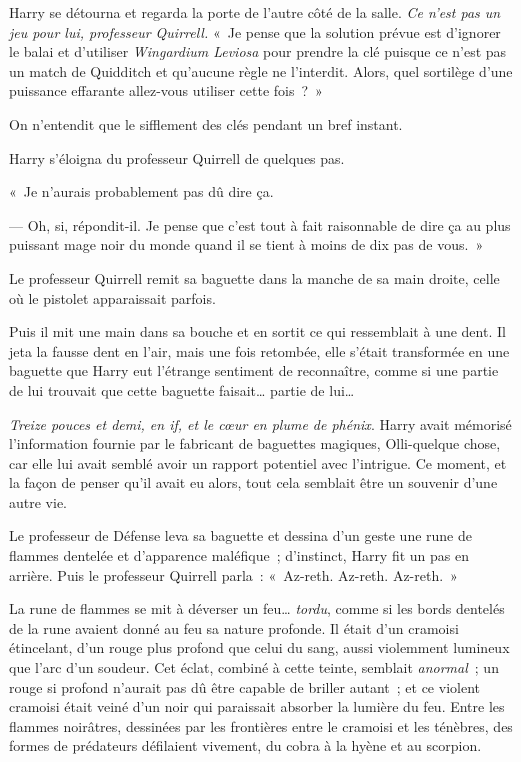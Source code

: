 Harry se détourna et regarda la porte de l'autre côté de la salle.
\emph{Ce n'est pas un jeu pour lui, professeur Quirrell.} «~Je pense que la solution prévue est d'ignorer le balai et d'utiliser \emph{Wingardium Leviosa} pour prendre la clé puisque ce n'est pas un match de Quidditch et qu'aucune règle ne l'interdit.
Alors, quel sortilège d'une puissance effarante allez-vous utiliser cette fois~?~»

On n'entendit que le sifflement des clés pendant un bref instant.

Harry s'éloigna du professeur Quirrell de quelques pas.

«~Je n'aurais probablement pas dû dire ça.

--- Oh, si, répondit-il.
Je pense que c'est tout à fait raisonnable de dire ça au plus puissant mage noir du monde quand il se tient à moins de dix pas de vous.~»

Le professeur Quirrell remit sa baguette dans la manche de sa main droite, celle où le pistolet apparaissait parfois.

Puis il mit une main dans sa bouche et en sortit ce qui ressemblait à une dent.
Il jeta la fausse dent en l'air, mais une fois retombée, elle s'était transformée en une baguette que Harry eut l'étrange sentiment de reconnaître, comme si une partie de lui trouvait que cette baguette faisait… partie de lui…

\emph{Treize pouces et demi, en if, et le cœur en plume de phénix}.
Harry avait mémorisé l'information fournie par le fabricant de baguettes magiques, Olli-quelque chose, car elle lui avait semblé avoir un rapport potentiel avec l'intrigue.
Ce moment, et la façon de penser qu'il avait eu alors, tout cela semblait être un souvenir d'une autre vie.

Le professeur de Défense leva sa baguette et dessina d'un geste une rune de flammes dentelée et d'apparence maléfique~; d'instinct, Harry fit un pas en arrière.
Puis le professeur Quirrell parla~: «~Az-reth.
Az-reth.
Az-reth.~»

La rune de flammes se mit à déverser un feu…
\emph{tordu}, comme si les bords dentelés de la rune avaient donné au feu sa nature profonde.
Il était d'un cramoisi étincelant, d'un rouge plus profond que celui du sang, aussi violemment lumineux que l'arc d'un soudeur.
Cet éclat, combiné à cette teinte, semblait \emph{anormal}~; un rouge si profond n'aurait pas dû être capable de briller autant~; et ce violent cramoisi était veiné d'un noir qui paraissait absorber la lumière du feu.
Entre les flammes noirâtres, dessinées par les frontières entre le cramoisi et les ténèbres, des formes de prédateurs défilaient vivement, du cobra à la hyène et au scorpion.

